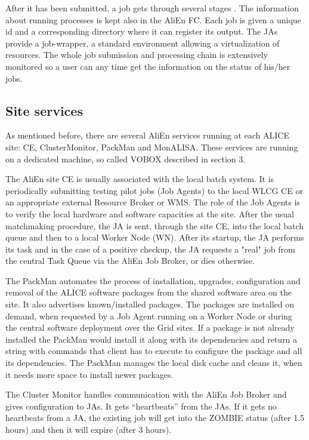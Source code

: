 After it has been submitted, a job gets through several stages \cite{job_status}.  The information about running processes is kept also in the
AliEn FC. Each job is given a unique id and a corresponding
directory where it can register its output. The JAs provide a job-wrapper, a standard environment
allowing a virtualization of resources. The whole job submission and
processing chain is extensively monitored so a user can any time get
the information on the status of his/her jobs.

\subsection{Site services}
%
As mentioned before, there are several AliEn services running at each ALICE site: 
CE, ClusterMonitor, PackMan and MonALISA.
These services are running on a dedicated machine, so called VOBOX
described in section 3.

The AliEn site CE is usually associated with the local batch system.
It is periodically submitting testing pilot jobs (Job Agents)  to
the local WLCG CE or an appropriate external Resource Broker or WMS.
The role of the Job Agents is to verify the local hardware and
software capacities at the site. After the usual matchmaking
procedure, the JA is sent, through the site CE, into the local batch
queue and then to a local Worker Node (WN). After its startup, the
JA performs its task and in the case of a positive checkup, the JA
requests a "real" job from the central Task Queue via the AliEn Job
Broker, or dies otherwise.

The PackMan automates the process of installation, upgrades,
configuration and removal of the ALICE software packages from the
shared software area on the site. It also advertises known/installed
packages. The packages are installed on demand, when requested by a
Job Agent running on a Worker Node or during the central software
deployment over the Grid sites. If a package is not already
installed the PackMan would install it along with its dependencies
and return a string with commands that client has to execute to
configure the package and all its dependencies. The PackMan manages
the local disk cache and cleans it, when it needs more space to
install newer packages.

The Cluster Monitor handles communication with the AliEn Job Broker
and gives configuration to JAs.  It gets ``heartbeats'' from the JAs.
If it gets no heartbeats from a JA, the existing job will get into
the ZOMBIE status (after 1.5 hours) and then it will expire (after 3 hours).

